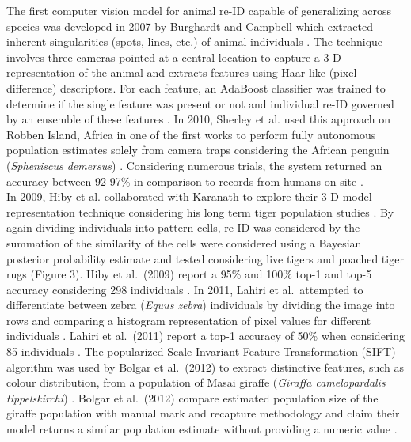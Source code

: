 \documentclass[11pt]{article}
\begin{document}
\noindent
The first computer vision model for animal re-ID capable of generalizing across species was developed in 2007 by Burghardt and Campbell which extracted inherent singularities (spots, lines, etc.) of animal individuals \cite{burghardt2007fully}. The technique involves three cameras pointed at a central location to capture a 3-D representation of the animal and extracts features using Haar-like (pixel difference) descriptors. For each feature, an AdaBoost classifier was trained to determine if the single feature was present or not and individual re-ID governed by an ensemble of these features \cite{burghardt2007fully}. In 2010, Sherley et al. used this approach on Robben Island, Africa in one of the first works to perform fully autonomous population estimates solely from camera traps considering the African penguin (\textit{Spheniscus demersus}) \cite{sherley2010spotting}. Considering numerous trials, the system returned an accuracy between 92-97\% in comparison to records from humans on site \cite{sherley2010spotting}. 
\newline
\\
In 2009, Hiby et al. collaborated with Karanath to explore their 3-D model representation technique considering his long term tiger population studies \cite{hiby2009tiger}. By again dividing individuals into pattern cells, re-ID was considered by the summation of the similarity of the cells were considered using a Bayesian posterior probability estimate and tested considering live tigers and poached tiger rugs (Figure 3). Hiby et al.\ (2009) report a 95\% and 100\% top-1 and top-5 accuracy considering 298 individuals \cite{hiby2009tiger}. In 2011, Lahiri et al.\ attempted to differentiate between zebra (\textit{Equus zebra}) individuals by dividing the image into rows and comparing a histogram representation of pixel values for different individuals \cite{lahiri2011biometric}. Lahiri et al.\ (2011) report a top-1 accuracy of 50\% when considering 85 individuals \cite{lahiri2011biometric}. The popularized Scale-Invariant Feature Transformation (SIFT) algorithm was used by Bolgar et al.\ (2012) to extract distinctive features, such as colour distribution, from a population of Masai giraffe (\textit{Giraffa camelopardalis tippelskirchi}) \cite{bolger2012computer}. Bolgar et al.\ (2012) compare estimated population size of the giraffe population with manual mark and recapture methodology and claim their model returns a similar population estimate without providing a numeric value \cite{bolger2012computer}. 
\newline
\end{document}
